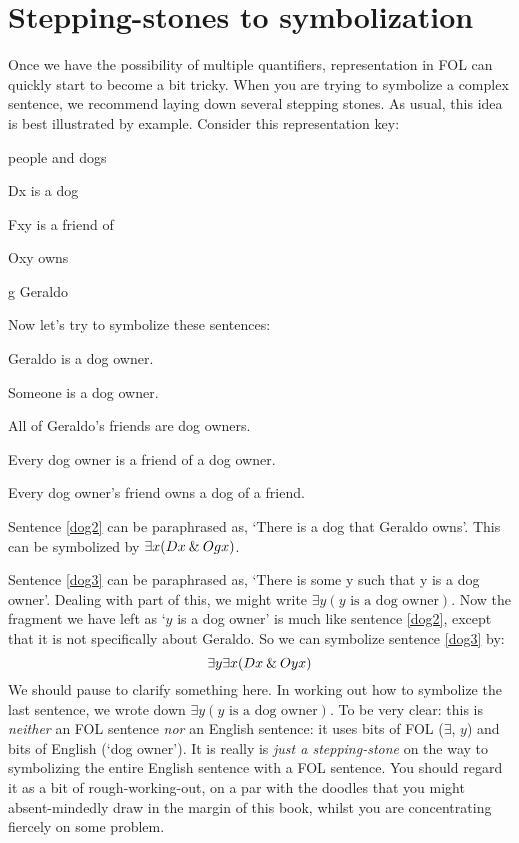 \section{Stepping-stones to symbolization}
Once we have the possibility of multiple quantifiers, representation in FOL can quickly start to become a bit tricky. When you are trying to symbolize a complex sentence, we recommend laying down several stepping stones. As usual, this idea is best illustrated by example. Consider this representation key:
\begin{ekey}
\item[\text{domain}] people and dogs
\item[Dx]  is a dog
\item[Fxy]  is a friend of 
\item[Oxy]  owns 
\item[g] Geraldo
\end{ekey}
Now let's try to symbolize these sentences:
\begin{earg}
\item[\ex{dog2}] Geraldo is a dog owner.
\item[\ex{dog3}] Someone is a dog owner.
\item[\ex{dog4}] All of Geraldo's friends are dog owners.
\item[\ex{dog5}] Every dog owner is a friend of a dog owner.
\item[\ex{dog6}] Every dog owner's friend owns a dog of a friend.
\end{earg}
Sentence \ref{dog2} can be paraphrased as, `There is a dog that Geraldo owns'. This can be symbolized by $\exists x(Dx \mathbin{\&} Ogx)$.

Sentence \ref{dog3} can be paraphrased as, `There is some y such that y is a dog owner'. Dealing with part of this, we might write $\exists y(y\text{ is a dog owner})$. Now the fragment we have left as `$y$ is a dog owner' is much like sentence \ref{dog2}, except that it is not specifically about Geraldo. So we can symbolize sentence \ref{dog3} by:
$$\exists y \exists x(Dx \mathbin{\&} Oyx)$$
We should pause to clarify something here. In working out how to symbolize the last sentence, we wrote down $\exists y(y\text{ is a dog owner})$. To be very clear: this is \emph{neither} an FOL sentence \emph{nor} an English sentence: it uses bits of FOL ($\exists$, $y$) and bits of English (`dog owner'). It is really is \emph{just a stepping-stone} on the way to symbolizing the entire English sentence with a FOL sentence. You should regard it as a bit of rough-working-out, on a par with the doodles that you might absent-mindedly draw in the margin of this book, whilst you are concentrating fiercely on some problem.

